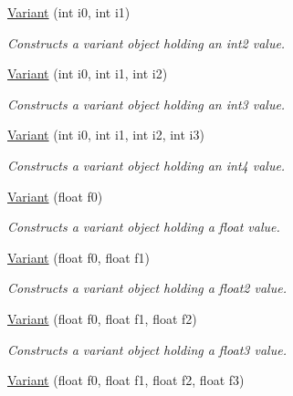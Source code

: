 \begin{DoxyCompactItemize}
\hyperlink{structembree_1_1_variant_a5bd2754ec65907c65ef97691e99f8306}{Variant} (int i0, int i1)
\begin{DoxyCompactList}\small\item\em Constructs a variant object holding an int2 value. \item\end{DoxyCompactList}\item 
\hyperlink{structembree_1_1_variant_ad1730984e02131a7d43938986cae8bee}{Variant} (int i0, int i1, int i2)
\begin{DoxyCompactList}\small\item\em Constructs a variant object holding an int3 value. \item\end{DoxyCompactList}\item 
\hyperlink{structembree_1_1_variant_adfa1f700e1c305fd52f80f40927eb825}{Variant} (int i0, int i1, int i2, int i3)
\begin{DoxyCompactList}\small\item\em Constructs a variant object holding an int4 value. \item\end{DoxyCompactList}\item 
\hyperlink{structembree_1_1_variant_ae4c08fbeaa3158f71d0b0fe8ae2cc658}{Variant} (float f0)
\begin{DoxyCompactList}\small\item\em Constructs a variant object holding a float value. \item\end{DoxyCompactList}\item 
\hyperlink{structembree_1_1_variant_ac001ada296990aaec6073068d68be3d5}{Variant} (float f0, float f1)
\begin{DoxyCompactList}\small\item\em Constructs a variant object holding a float2 value. \item\end{DoxyCompactList}\item 
\hyperlink{structembree_1_1_variant_a9e6cfb2c59ed8748cc25141f54303282}{Variant} (float f0, float f1, float f2)
\begin{DoxyCompactList}\small\item\em Constructs a variant object holding a float3 value. \item\end{DoxyCompactList}\item 
\hyperlink{structembree_1_1_variant_a380dc924782c2a56a8bfc2940b6730da}{Variant} (float f0, float f1, float f2, float f3)

\end{DoxyCompactItemize}
